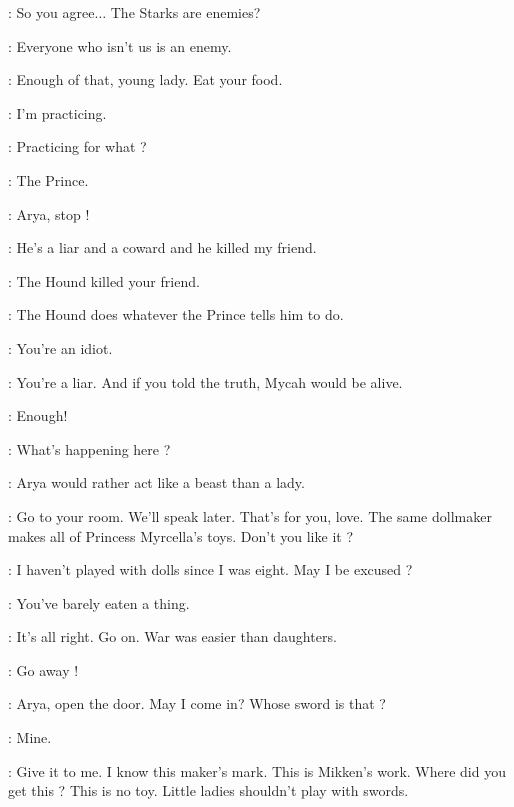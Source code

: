 \JOFFREY: So you agree$\ldots$ The Starks are enemies? 

\CERSEI: Everyone who isn't us is an enemy. 

\scene



\SEPTAMORDANE: Enough of that, young lady. Eat your food. 

\ARYA: I'm practicing. 

\SANSA: Practicing for what ? 

\ARYA: The Prince. 

\SEPTAMORDANE: Arya, stop ! 

\ARYA: He's a liar and a coward and he killed my friend. 

\SANSA: The Hound killed your friend. 

\ARYA: The Hound does whatever the Prince tells him to do. 

\SANSA: You're an idiot. 

\ARYA: You're a liar. And if you told the truth, Mycah would be alive. 

\SEPTAMORDANE: Enough! 


\NED: What's happening here ? 

\SEPTAMORDANE: Arya would rather act like a beast than a lady. 

\NED: Go to your room. We'll speak later. That's for you, love. The same dollmaker makes all of Princess Myrcella's toys. Don't you like it ? 

\SANSA: I haven't played with dolls since I was eight. May I be excused ? 

\SEPTAMORDANE: You've barely eaten a thing. 

\NED: It's all right. Go on. War was easier than daughters. 

\scene




\ARYA: Go away ! 

\NED: Arya, open the door. May I come in?   Whose sword is that ? 

\ARYA: Mine. 

\NED: Give it to me. I know this maker's mark. This is Mikken's work. Where did you get this ? This is no toy. Little ladies shouldn't play with swords. 

